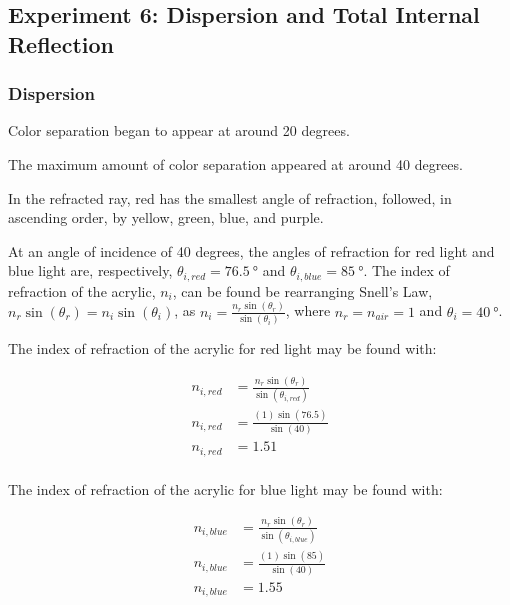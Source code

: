 \documentclass[12pt]{article}
\begin{document}


\subsection{Experiment 6: Dispersion and Total Internal Reflection}

\subsubsection{Dispersion}

\subsubsubsection{}

Color separation began to appear at around 20 degrees.

\subsubsubsection{}

The maximum amount of color separation appeared at around 40 degrees.

\subsubsubsection{}

In the refracted ray, red has the smallest angle of refraction, followed, in
ascending order, by yellow, green, blue, and purple.

\subsubsubsection{}

At an angle of incidence of 40 degrees, the angles of refraction for red light
and blue light are, respectively, \(\theta_{i,red} = \SI{76.5}{\degree}\) and
\(\theta_{i,blue} = \SI{85}{\degree}\). The index of refraction of the acrylic,
\(n_i\), can be found be rearranging Snell's Law,
\(n_r \sin{(\theta_r)} = n_i \sin{(\theta_i)}\), as
\(n_i = \frac{n_r \sin{(\theta_r)}}{\sin{(\theta_i)}}\), where
\(n_r = n_{air} = 1\) and \(\theta_i = \SI{40}{\degree}\).

The index of refraction of the acrylic for red light may be found with:

\begin{align*}
  n_{i,red} &= \frac{n_r \sin{(\theta_r)}}{\sin{(\theta_{i,red})}} \\
  n_{i,red} &= \frac{(1) \sin{(76.5)}}{\sin{(40)}} \\
  n_{i,red} &= 1.51 \\
\end{align*}

The index of refraction of the acrylic for blue light may be found with:


\begin{align*}
  n_{i,blue} &= \frac{n_r \sin{(\theta_r)}}{\sin{(\theta_{i,blue})}} \\
  n_{i,blue} &= \frac{(1) \sin{(85)}}{\sin{(40)}} \\
  n_{i,blue} &= 1.55 \\
\end{align*}
\end{document}
